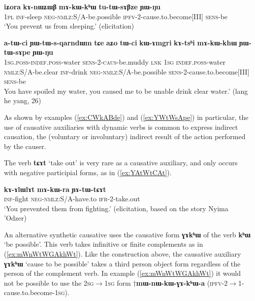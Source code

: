 \documentclass[oneside,a4paper,11pt]{article}
\newcommand{\ipa}[1]{\textbf{\phon#1}} %
\newcommand{\jpg}[2]{\ipa{#1} `#2'} %
\newcommand{\refb}[1]{(\ref{#1})}
\begin{document}
\begin{exe}
\ex  \label{ex:tutWsABze}
\gll 
 \ipa{iʑora} 	\ipa{kɤ-nɯʑɯβ} 	\ipa{mɤ-kɯ-kʰɯ} 	\ipa{tu-tɯ-sɤβze} 	\ipa{ɲɯ-ŋu}  \\
 \textsc{1pl} \textsc{inf}-sleep \textsc{neg-nmlz}:S/A-be.possible \textsc{ipfv}-2-cause.to.become[III] \textsc{sens}-be \\
\glt `You prevent us from sleeping.' (elicitation)
 \end{exe}
 
 \begin{exe}
\ex  \label{ex:YWtWsApe}
\gll 
 \ipa{a-tɯ-ci} 	\ipa{ɲɯ-tɯ-s-qarndɯm} 	\ipa{tɕe} 	\ipa{aʑo} 	\ipa{tɯ-ci} 	\ipa{kɯ-ɤmgri} 	\ipa{kɤ-tsʰi} 	\ipa{mɤ-kɯ-khɯ} 	\ipa{ɲɯ-tɯ-sɤpe} 	\ipa{ɲɯ-ŋu}  \\
\textsc{1sg.poss-indef.poss}-water \textsc{sens-2-caus}-be.muddy \textsc{lnk} \textsc{1sg} \textsc{indef.poss}-water \textsc{nmlz}:S/A-be.clear \textsc{inf}-drink \textsc{neg}-\textsc{nmlz}:S/A-be.possible \textsc{sens}-2-cause.to.become[III] \textsc{sens}-be \\
\glt  You have spoiled my water, you caused me to be unable drink clear water.' (lang he yang, 26)
 \end{exe}
 
 As shown by examples \refb{ex:CWkABde} and \refb{ex:YWtWsApe} in particular, the use of causative auxiliaries with dynamic verbs is common to express indirect causation, the (voluntary or involuntary) indirect result of the action performed by the causer.
   
The verb \jpg{tɕɤt}{take out} is very rare as a causative auxiliary, and only occurs with negative participial forms, as in \refb{ex:YAtWtCAt}.

\begin{exe}
\ex \label{ex:YAtWtCAt}
 \gll  	  \ipa{kɤ-ɤlɯlɤt} 	\ipa{mɤ-kɯ-ra} 	\ipa{ɲɤ-tɯ-tɕɤt} \\
 \textsc{inf}-fight \textsc{neg-nmlz}:S/A-have.to \textsc{ifr}-2-take.out \\
 \glt `You prevented them from fighting.' (elicitation, based on the story Nyima 'Odzer)
   \end{exe}  

An alternative synthetic causative uses the causative form \ipa{ɣɤkʰɯ} of the verb \jpg{kʰɯ}{be possible}. This verb takes infinitive or finite complements as in \refb{ex:mWnWtWGAkhWt}. Like the construction above, the causative auxiliary \jpg{ɣɤkʰɯ}{cause to be possible} takes a third person object form regardless of the person of the complement verb. In example \refb{ex:mWnWtWGAkhWt} it would not be possible to use the \textsc{2sg$\rightarrow$1sg} form $\dagger$\ipa{mɯ-nɯ-kɯ-ɣɤ-kʰɯ-a} (\textsc{ipfv}-2$\rightarrow$1-cause.to.become-\textsc{1sg}).
\end{document}
